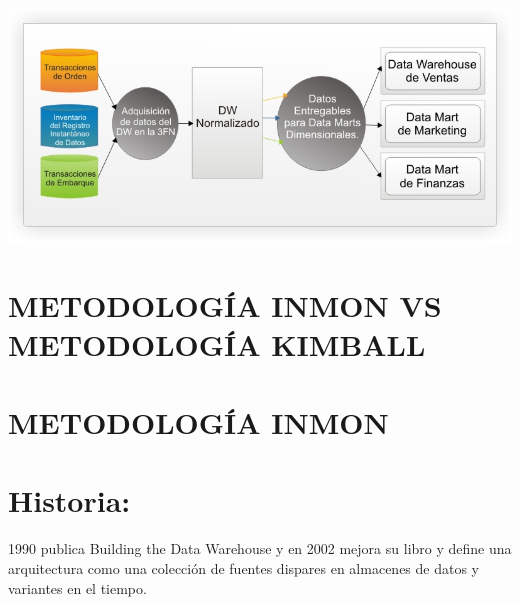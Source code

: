 \begin{center}
\includegraphics[width=16cm]{./Imagenes/image003}
\end{center}


\newpage


\section{METODOLOGÍA INMON VS METODOLOGÍA KIMBALL}


\section{METODOLOGÍA INMON}
\section{Historia:}
1990 publica Building the Data Warehouse y en 2002 mejora su libro y define una arquitectura como una colección de fuentes dispares en almacenes de datos y variantes en el tiempo.
